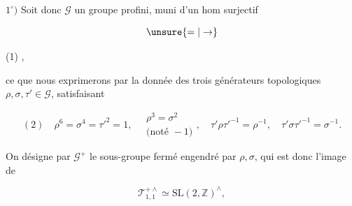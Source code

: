 $1^\circ)$ Soit donc $\mathcal G$ un groupe profini, muni d'un hom surjectif

\[\unsure{=|\to}\]

\noindent(1)\quad
{},

ce que nous exprimerons par la donnée des trois générateurs topologiques
$\rho,\sigma,\tau'\in\mathcal G$, satisfaisant

\[
(2)\quad \rho^6=\sigma^4=\tau'^2=1,\quad
\begin{gathered}\rho^3=\sigma^2\\\text{(noté }-1\text{)}\end{gathered},\quad
\tau'\rho\tau'^{-1}=\rho^{-1},\quad
\tau'\sigma\tau'^{-1}=\sigma^{-1}.
\]

On désigne par $\mathcal G^+$ le sous-groupe fermé engendré par $\rho,\sigma$,
qui est donc l'image de

\[
\mathcal T_{1,1}^{+\wedge}\simeq\mathrm{SL}(2,\mathbb Z)^{\wedge},
\]


